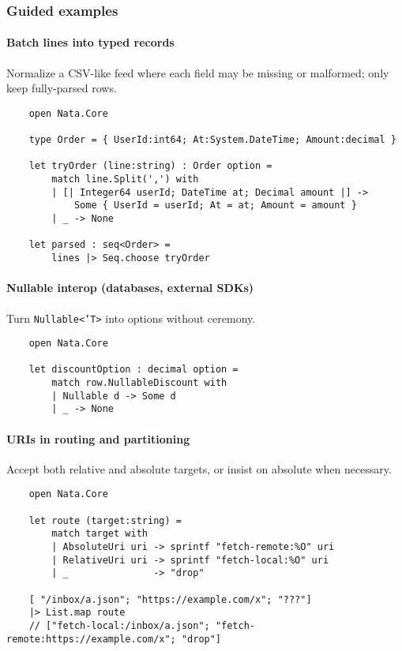 \documentclass{article}
\begin{document}
\subsubsection{Guided examples}
\paragraph{Batch lines into typed records}
Normalize a CSV-like feed where each field may be missing or malformed; only keep fully-parsed rows.
\begin{verbatim}
    open Nata.Core

    type Order = { UserId:int64; At:System.DateTime; Amount:decimal }

    let tryOrder (line:string) : Order option =
        match line.Split(',') with
        | [| Integer64 userId; DateTime at; Decimal amount |] ->
            Some { UserId = userId; At = at; Amount = amount }
        | _ -> None

    let parsed : seq<Order> =
        lines |> Seq.choose tryOrder
\end{verbatim}

\paragraph{Nullable interop (databases, external SDKs)}
Turn \texttt{Nullable<'T>} into options without ceremony.
\begin{verbatim}
    open Nata.Core

    let discountOption : decimal option =
        match row.NullableDiscount with
        | Nullable d -> Some d
        | _ -> None
\end{verbatim}

\paragraph{URIs in routing and partitioning}
Accept both relative and absolute targets, or insist on absolute when necessary.
\begin{verbatim}
    open Nata.Core

    let route (target:string) =
        match target with
        | AbsoluteUri uri -> sprintf "fetch-remote:%O" uri
        | RelativeUri uri -> sprintf "fetch-local:%O" uri
        | _               -> "drop"

    [ "/inbox/a.json"; "https://example.com/x"; "???"]
    |> List.map route
    // ["fetch-local:/inbox/a.json"; "fetch-remote:https://example.com/x"; "drop"]
\end{verbatim}
\end{document}
